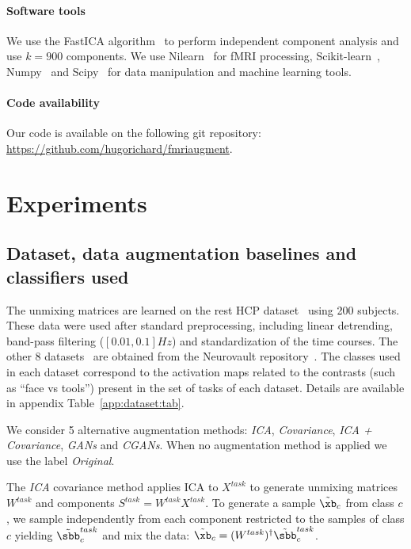 \paragraph{Software tools}
We use the FastICA algorithm~\cite{hyvarinen_fast_1999} to perform independent component analysis and use $k=900$ components. We use Nilearn~\cite{abraham_machine_2014} for fMRI
processing, Scikit-learn~\cite{pedregosa2011scikit},
Numpy~\cite{harris2020array} and Scipy~\cite{2020SciPy-NMeth} for data
manipulation and machine learning tools.

\paragraph{Code availability}
Our code is available on the following git repository:
\url{https://github.com/hugorichard/fmriaugment}.
%


\section{Experiments}
\subsection{Dataset, data augmentation baselines and classifiers used}
The unmixing matrices are learned on the rest HCP
dataset~\cite{van2013wu} using 200 subjects.
These data were used after standard
preprocessing, including linear detrending, band-pass filtering
($[0.01, 0.1]Hz$) and standardization of the time courses.
The other 8 datasets~\cite{van2013wu, shafto2014cambridge,
  orfanos2017brainomics, pinel2019functional, pinel2007fast, pinel2013genetic,
  poldrack2016phenome, pinel2013genetic} are obtained from the Neurovault repository~\cite{gorgolewski2015neurovault}.
The classes used in each dataset correspond to the activation maps
related to the contrasts (such as ``face vs tools'')
present in the set of tasks of each dataset. Details are available in
appendix Table~\ref{app:dataset:tab}.

We consider 5 alternative
augmentation methods: \emph{ICA}, \emph{Covariance}, \emph{ICA + Covariance}, \emph{GANs} and \emph{CGANs}.
%
When no augmentation method is applied we use the label \emph{Original}.

The \emph{ICA} covariance method applies ICA to $X^{task}$ to generate unmixing matrices $W^{task}$ and
components $S^{task}=  W^{task} X^{task}$.
%
To generate a sample $\tilde{\xb}_c$ from class $c$, we sample
independently from each component restricted to the samples of class $c$ yielding $\tilde{\sbb}^{task}_c$ and mix the data: $\tilde{\xb}_c = (W^{task})^{\dagger}
\tilde{\sbb}^{task}_c$.
%

